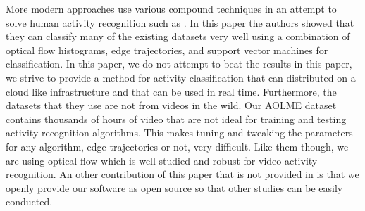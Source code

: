 More modern approaches use various compound techniques in an attempt to solve
human activity recognition such as \cite{wang2016action}. In this paper the
authors showed that they can classify many of the existing datasets very well
using a combination of optical flow histograms, edge trajectories, and support
vector machines for classification. In this paper, we do not attempt to beat
the results in this paper, we strive to provide a method for activity
classification that can distributed on a cloud like infrastructure and that can
be used in real time. Furthermore, the datasets that they use are not from
videos in the wild. Our AOLME dataset contains thousands of hours of video that
are not ideal for training and testing activity recognition algorithms. This
makes tuning and tweaking the parameters for any algorithm, edge trajectories or
not, very difficult. Like them though, we are using optical flow which is well
studied and robust for video activity recognition. An other contribution of this
paper that is not provided in \cite{wang2016action} is that we openly provide
our software as open source so that other studies can be easily conducted.


